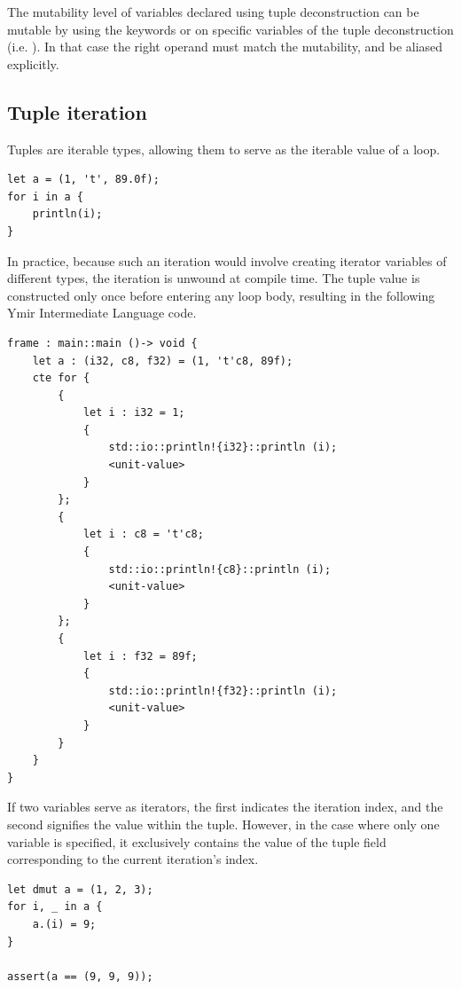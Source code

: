The mutability level of variables declared using tuple deconstruction can be
mutable by using the keywords  or  on specific
variables of the tuple deconstruction (i.e. ). In that case the right operand must match the mutability, and be aliased
explicitly.

\subsection {Tuple iteration}

Tuples are iterable types, allowing them to serve as the iterable value of a  loop.

\begin{lstlisting}[style=coloredverbatim]
let a = (1, 't', 89.0f);
for i in a {
    println(i);
}
\end{lstlisting}

In practice, because such an iteration would involve creating iterator variables
of different types, the iteration is unwound at compile time. The tuple value is
constructed only once before entering any loop body, resulting in the following
Ymir Intermediate Language code.

\begin{lstlisting}[style=myilVerb]
frame : main::main ()-> void {
    let a : (i32, c8, f32) = (1, 't'c8, 89f);
    cte for {
        {
            let i : i32 = 1;
            {
                std::io::println!{i32}::println (i);
                <unit-value>
            }
        };
        {
            let i : c8 = 't'c8;
            {
                std::io::println!{c8}::println (i);
                <unit-value>
            }
        };
        {
            let i : f32 = 89f;
            {
                std::io::println!{f32}::println (i);
                <unit-value>
            }
        }
    }
}
\end{lstlisting}

If two variables serve as iterators, the first indicates the iteration index,
and the second signifies the value within the tuple. However, in the case where
only one variable is specified, it exclusively contains the value of the tuple
field corresponding to the current iteration's index.

\begin{lstlisting}[style=coloredverbatim]
let dmut a = (1, 2, 3);
for i, _ in a {
    a.(i) = 9;
}

assert(a == (9, 9, 9));
\end{lstlisting}

